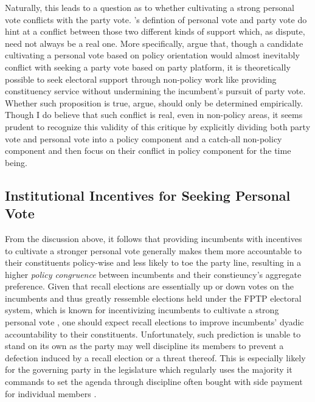 \documentclass{article}
\begin{document}
			
			Naturally, this leads to a question as to
			whether cultivating a strong personal vote
			conflicts with the party vote.
			\citeauthor{cainPersonalVoteConstituency1987}'s
			\autocite*{cainPersonalVoteConstituency1987}
			defintion of personal vote and party vote
			do
			hint at a conflict between those two different kinds of support
			which,
			as
			\citeauthor{carseyRethinkingNormalVote2017}
			\autocite*{carseyRethinkingNormalVote2017}
			dispute,
			need not always be a real one.
%			
			More specifically,
			\citeauthor{carseyRethinkingNormalVote2017}
			\autocite*{carseyRethinkingNormalVote2017}
			argue that,
			though a candidate cultivating a personal vote based on policy orientation
			would almost inevitably conflict with seeking a party vote based on party platform,
			it is theoretically possible to
			seek electoral support through non-policy work like providing constituency service
			without undermining the incumbent's pursuit of party vote.
			Whether such proposition is true,
			\citeauthor{carseyRethinkingNormalVote2017}
			\autocite*{carseyRethinkingNormalVote2017}
			argue,
			should only be determined empirically.
%			
			Though I do believe that such conflict is real, even in non-policy areas,
			it seems prudent
			to recognize this validity of this critique 
			by explicitly dividing both party vote and personal vote into
			a
			policy component
			and a
			catch-all
			non-policy component
			and
			then
			focus on their conflict in policy component for the time being.
			
			
		\subsection*{Institutional Incentives for Seeking Personal Vote}
			
			From the discussion above,
			it follows that providing incumbents with incentives to cultivate a stronger personal vote
			generally makes them more accountable to their constituents policy-wise and
			less likely to toe
			the party line,
			resulting in a higher \textit{policy congruence} between incumbents and their constieuncy's aggregate preference.
			Given that recall elections are essentially
			up or down votes on the incumbents
			and thus greatly ressemble elections held under the
			FPTP electoral system,
			which is known for incentivizing incumbents to cultivate a strong personal vote
			\autocite{careyIncentivesCultivatePersonal1995},
			one should expect recall elections
			to improve incumbents' dyadic accountability to their constituents.
			Unfortunately,
			such prediction is unable to stand on its own
			as the party may well discipline
			its members to prevent a defection induced by a recall election or a threat thereof.
			This is especially likely for the governing party in the legislature
			which
			regularly
			uses the majority it commands to set the agenda
			through discipline often bought with
			side payment for individual members
			\autocite{coxSettingAgendaResponsible2005}.
			
\end{document}
